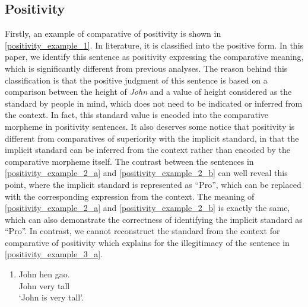 \documentclass{ctexart}
\begin{document}
\subsection{Positivity}

\noindent
Firstly, an example of comparative of positivity is shown in \ref{positivity_example_1}. In literature, it is classified into the positive form. In this paper, we identify this sentence as positivity expressing the comparative meaning, which is significantly different from previous analyses. The reason behind this classification is that the positive judgment of this sentence is based on a comparison between the height of \textit{John} and a value of height considered as the standard by people in mind, which does not need to be indicated or inferred from the context. In fact, this standard value is encoded into the comparative morpheme in positivity sentences. It also deserves some notice that positivity is different from comparatives of superiority with the implicit standard, in that the implicit standard can be inferred from the context rather than encoded by the comparative morpheme itself. The contrast between the sentences in \ref{positivity_example_2_a} and \ref{positivity_example_2_b} can well reveal this point, where the implicit standard is represented as ``Pro'', which can be replaced with the corresponding expression from the context. The meaning of \ref{positivity_example_2_a} and \ref{positivity_example_2_b} is exactly the same, which can also demonstrate the correctness of identifying the implicit standard as ``Pro''. In contrast, we cannot reconstruct the standard from the context for comparative of positivity which explains for the illegitimacy of the sentence in \ref{positivity_example_3_a}.

\begin{enumerate}
    \item \label{positivity_example_1}
    John hen gao.  \\
    John very tall \\
    `John is very tall'.
\end{enumerate}
\end{document}
